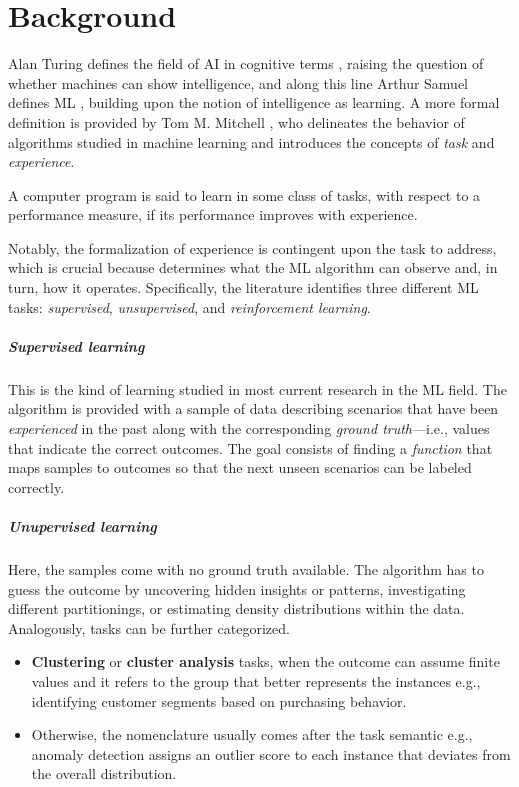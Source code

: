 \documentclass[a4paper,12pt,times,numbered,print,index]{Classes/PhDThesisPSnPDF}
\begin{document}
\chapter{Background}
\label{chap:background}

Alan Turing defines the field of AI in cognitive terms \cite{turing1980computing}, raising the question of whether machines can show intelligence, and along this line Arthur Samuel defines ML \cite{samuel2000some}, building upon the notion of intelligence as learning.
A more formal definition is provided by Tom M. Mitchell \citep{mitchell1997machine}, who delineates the behavior of algorithms studied in machine learning and introduces the concepts of \textit{task} and \textit{experience}.
\begin{definition}
    A computer program is said to learn in some class of tasks, with respect to a performance measure, if its performance improves with experience.
\end{definition}
Notably, the formalization of experience is contingent upon the task to address, which is crucial because determines what the ML algorithm can observe and, in turn, how it operates.
Specifically, the literature identifies three different ML tasks: \textit{supervised}, \textit{unsupervised}, and \textit{reinforcement learning}.

\paragraph{Supervised learning} This is the kind of learning studied in most current research in the ML field. The algorithm is provided with a sample of data describing scenarios that have been \textit{experienced} in the past along with the corresponding \textit{ground truth}---i.e., values that indicate the correct outcomes.
The goal consists of finding a \textit{function} that maps samples to outcomes so that the next unseen scenarios can be labeled correctly.


\paragraph{Unupervised learning}
Here, the samples come with no ground truth available.
The algorithm has to guess the outcome by uncovering hidden insights or patterns, investigating different partitionings, or estimating density distributions within the data.
Analogously, tasks can be further categorized.
\begin{itemize}
    \item \textbf{Clustering} or \textbf{cluster analysis} tasks, when the outcome can assume finite values and it refers to the group that better represents the instances e.g., identifying customer segments based on purchasing behavior.
    \item Otherwise, the nomenclature usually comes after the task semantic e.g., anomaly detection assigns an outlier score to each instance that deviates from the overall distribution.
\end{itemize}
\end{document}
